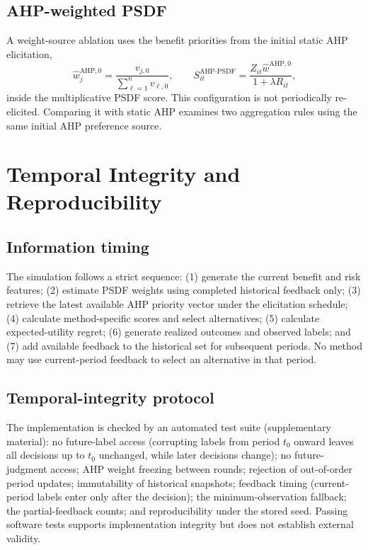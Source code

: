 \documentclass[12pt,a4paper]{article}
\begin{document}
\subsection{AHP-weighted PSDF}
A weight-source ablation uses the benefit priorities from the initial static AHP elicitation,
\begin{equation}\hat w^{\mathrm{AHP},0}_j=\frac{v_{j,0}}{\sum_{\ell=1}^n v_{\ell,0}},\qquad S^{\mathrm{AHP\text{-}PSDF}}_{it}=\frac{Z_{it}\hat w^{\mathrm{AHP},0}}{1+\lambda R_{it}},\end{equation}
inside the multiplicative PSDF score. This configuration is not periodically re-elicited. Comparing it with static AHP examines two aggregation rules using the same initial AHP preference source.

\section{Temporal Integrity and Reproducibility}
\subsection{Information timing}
The simulation follows a strict sequence: (1) generate the current benefit and risk features; (2) estimate PSDF weights using completed historical feedback only; (3) retrieve the latest available AHP priority vector under the elicitation schedule; (4) calculate method-specific scores and select alternatives; (5) calculate expected-utility regret; (6) generate realized outcomes and observed labels; and (7) add available feedback to the historical set for subsequent periods. No method may use current-period feedback to select an alternative in that period.

\subsection{Temporal-integrity protocol}
The implementation is checked by an automated test suite (supplementary material): no future-label access (corrupting labels from period $t_0$ onward leaves all decisions up to $t_0$ unchanged, while later decisions change); no future-judgment access; AHP weight freezing between rounds; rejection of out-of-order period updates; immutability of historical snapshots; feedback timing (current-period labels enter only after the decision); the minimum-observation fallback; the partial-feedback counts; and reproducibility under the stored seed. Passing software tests supports implementation integrity but does not establish external validity.
\end{document}
